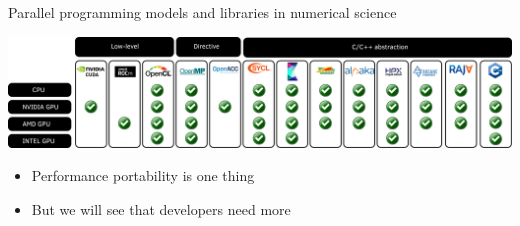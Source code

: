 \documentclass[aspectratio=169]{beamer}
\begin{document}

\begin{frame}{Parallel programming models and libraries in numerical science}
    \begin{center}
        \includegraphics[width=\textwidth]{prog_model.png}
    \end{center}
    \begin{itemize}
        \item Performance portability is one thing
        \item But we will see that developers need more
    \end{itemize}
\end{frame}

\end{document}
